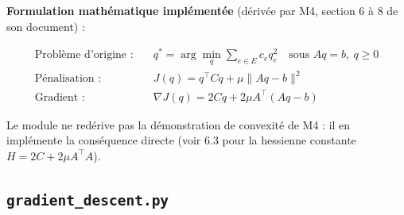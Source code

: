 \documentclass[11pt,a4paper]{article}
\begin{document}
\textbf{Formulation mathématique implémentée} (dérivée par M4, section 6 à 8
de son document) :

\begin{align}
  \text{Problème d'origine :} \quad & q^* = \arg\min_q \sum_{e \in E} c_e
  q_e^2 \quad \text{sous } Aq = b,\ q \geq 0 \label{eq:probleme} \\
  \text{Pénalisation :} \quad & J(q) = q^\top C q + \mu \lVert Aq - b
  \rVert^2 \label{eq:objectif} \\
  \text{Gradient :} \quad & \nabla J(q) = 2Cq + 2\mu A^\top(Aq - b)
  \label{eq:gradient}
\end{align}

Le module ne redérive pas la démonstration de convexité de M4 : il en
implémente la conséquence directe (voir 6.3 pour la hessienne constante $H =
2C + 2\mu A^\top A$).

\subsection{\texttt{gradient\_descent.py}}
\end{document}
